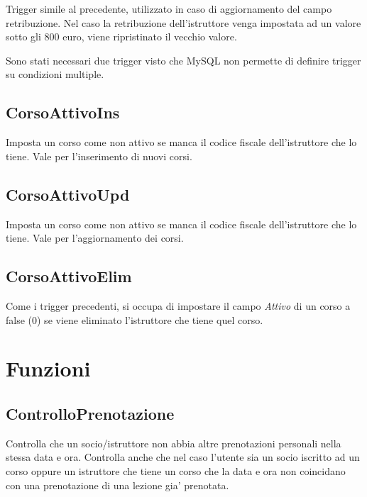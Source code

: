 Trigger simile al precedente, utilizzato in caso di aggiornamento del campo retribuzione. Nel caso la retribuzione dell'istruttore venga impostata ad un valore sotto gli 800 euro, viene ripristinato il vecchio valore.

Sono stati necessari due trigger visto che MySQL non permette di definire trigger su condizioni multiple.

\subsection{CorsoAttivoIns}


Imposta un corso come non attivo se manca il codice fiscale dell'istruttore che lo tiene. Vale per l'inserimento di nuovi corsi.

\subsection{CorsoAttivoUpd}



Imposta un corso come non attivo se manca il codice fiscale dell'istruttore che lo tiene. Vale per l'aggiornamento dei corsi.

\subsection{CorsoAttivoElim}



Come i trigger precedenti, si occupa di impostare il campo \textit{Attivo} di un corso a false (0) se viene eliminato l'istruttore che tiene quel corso.

\section{Funzioni}

\subsection{ControlloPrenotazione}



Controlla che un socio/istruttore non abbia altre prenotazioni personali nella stessa data e ora.
Controlla anche che nel caso l'utente sia un socio iscritto ad un corso oppure un istruttore che tiene un corso che la data e ora non coincidano con una prenotazione di una lezione gia' prenotata.

